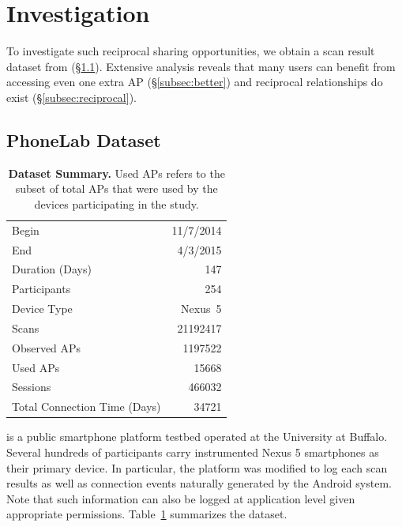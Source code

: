 \newpage
\clearpage

\section{Investigation}
\label{sec:investigation}

To investigate such reciprocal sharing opportunities, we obtain a \wifi{} scan
result dataset from \PhoneLab{} (\S\ref{subsec:phonelab}). Extensive analysis
reveals that many users can benefit from accessing even one extra \wifi{} AP
(\S\ref{subsec:better}) and reciprocal relationships do exist
(\S\ref{subsec:reciprocal}).

\subsection{PhoneLab \wifi{} Dataset}
\label{subsec:phonelab}

\begin{table}[t]
  \begin{tabularx}{\columnwidth}{Xr}
    \toprule
    Begin & 11/7/2014 \\ 
    End & 4/3/2015 \\ 
    Duration (Days) & 147 \\ \midrule
    Participants & 254 \\
    Device Type & Nexus~5 \\ \midrule
    Scans & \num{21192417} \\
    Observed APs & \num{1197522} \\
    Used APs & \num{15668} \\ \midrule
    \wifi{} Sessions & \num{466032} \\
    Total Connection Time (Days) & \num{34721} \\
    \bottomrule
  \end{tabularx}
  \caption{\textbf{\PhoneLab{} \wifi{} Dataset Summary.} Used APs refers to the subset of
  total APs that were used by the devices participating in the study.}
  \label{tab:summary}
\end{table}

\PhoneLab{}\cite{phonelab-sensemine13} is a public smartphone platform testbed
operated at the University at Buffalo. Several hundreds of participants carry
instrumented Nexus 5 smartphones as their primary device. In particular, the
platform was modified to log each \wifi{} scan results as well as connection
events naturally generated by the Android system. Note that such information can
also be logged at application level given appropriate permissions.
Table~\ref{tab:summary} summarizes the \PhoneLab{} \wifi{} dataset.

